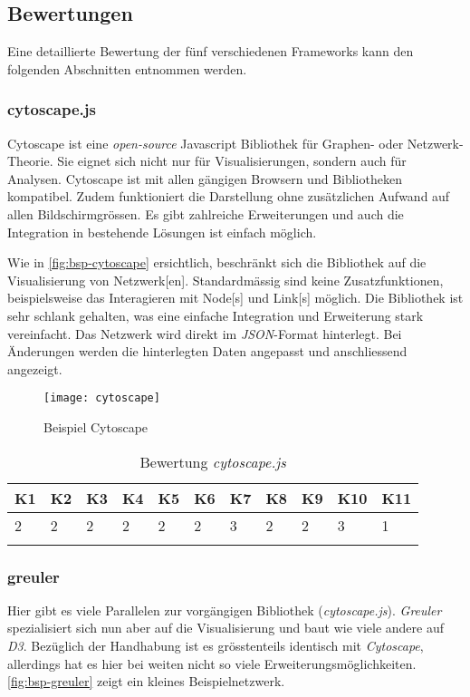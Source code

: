 \subsection{Bewertungen}\label{Bewertungen}
Eine detaillierte Bewertung der fünf verschiedenen \gls{Framework}s kann den folgenden Abschnitten entnommen werden.

\subsubsection{cytoscape.js}
\label{cytoscape}
Cytoscape ist eine \textit{open-source} Javascript Bibliothek für Graphen- oder \gls{Netzwerk}-Theorie. Sie eignet sich nicht nur für Visualisierungen, sondern auch für Analysen. Cytoscape ist mit allen gängigen Browsern und Bibliotheken kompatibel. Zudem funktioniert die Darstellung ohne zusätzlichen Aufwand auf allen Bildschirmgrössen. Es gibt zahlreiche Erweiterungen und auch die Integration in bestehende Lösungen ist einfach möglich. \citep{1_franz_lopes_huck_dong_sumer_bader_2016}

Wie in \autoref{fig:bsp-cytoscape} ersichtlich, beschränkt sich die Bibliothek auf die Visualisierung von \gls{Netzwerk}[en]. Standardmässig sind keine Zusatzfunktionen, beispielsweise das Interagieren mit \gls{Node}[s] und \gls{Link}[s] möglich. Die Bibliothek ist sehr schlank gehalten, was eine einfache Integration und Erweiterung stark vereinfacht. Das \gls{Netzwerk} wird direkt im \textit{JSON}-Format hinterlegt. Bei Änderungen werden die hinterlegten Daten angepasst und anschliessend angezeigt.

\begin{figure}[htbp]
\centering
\texttt{[image: cytoscape]}
\caption{Beispiel Cytoscape}
\label{fig:bsp-cytoscape}
\end{figure}


\begin{longtable}{|p{0.5cm}|p{0.5cm}|p{0.5cm}|p{0.5cm}|p{0.5cm}|p{0.5cm}|p{0.5cm}|p{0.5cm}|p{0.5cm}|p{0.7cm}|p{0.7cm}|}
  \hline
    K1 & K2 & K3 & K4 & K5 & K6 & K7 & K8 & K9 & K10 & K11 \\\hline
    2 & 2 & 2 & 2 & 2 & 2 & 3 & 2 & 2 & 3 & 1\\\hline
    \caption{Bewertung  \textit{cytoscape.js}}
  \label{tab:bewertung-cytoscape}
\end{longtable}

\subsubsection{greuler}
Hier gibt es viele Parallelen zur vorgängigen Bibliothek (\textit{cytoscape.js}). \textit{Greuler} spezialisiert sich nun aber auf die Visualisierung und baut wie viele andere auf \textit{D3}. Bezüglich der Handhabung ist es grösstenteils identisch mit \textit{Cytoscape}, allerdings hat es hier bei weiten nicht so viele Erweiterungsmöglichkeiten. \autoref{fig:bsp-greuler} zeigt ein kleines Beispielnetzwerk. \citep{2_maurizzzio/greuler_2016}

